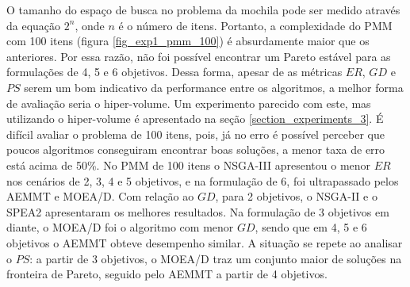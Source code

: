 O tamanho do espaço de busca no problema da mochila pode ser medido através da equação $2^n$, onde $n$ é o número de itens. Portanto, a complexidade do PMM com 100 itens (figura \ref{fig_exp1_pmm_100}) é absurdamente maior que os anteriores. Por essa razão, não foi possível encontrar um Pareto estável para as formulações de 4, 5 e 6 objetivos. Dessa forma, apesar de as métricas $ER$, $GD$ e $PS$ serem um bom indicativo da performance entre os algoritmos, a melhor forma de avaliação seria o hiper-volume. Um experimento parecido com este, mas utilizando o hiper-volume é apresentado na seção \ref{section_experiments_3}. É difícil avaliar o problema de 100 itens, pois, já no erro é possível perceber que poucos algoritmos conseguiram encontrar boas soluções, a menor taxa de erro está acima de 50\%. No PMM de 100 itens o NSGA-III apresentou o menor $ER$ nos cenários de 2, 3, 4 e 5 objetivos, e na formulação de 6, foi ultrapassado pelos AEMMT e MOEA/D. Com relação ao $GD$, para 2 objetivos, o NSGA-II e o SPEA2 apresentaram os melhores resultados. Na formulação de 3 objetivos em diante, o MOEA/D foi o algoritmo com menor $GD$, sendo que em 4, 5 e 6 objetivos o AEMMT obteve desempenho similar. A situação se repete ao analisar o $PS$: a partir de 3 objetivos, o MOEA/D traz um conjunto maior de soluções na fronteira de Pareto, seguido pelo AEMMT a partir de 4 objetivos.


